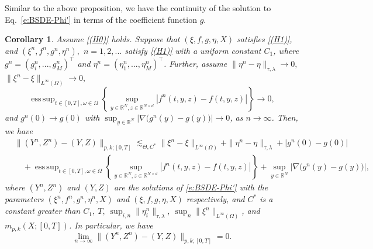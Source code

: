 \documentclass[11pt,reqno]{amsart}
\def\R{\mathbb R}
\newtheorem{corollary}{Corollary}[section]
\DeclareMathOperator*{\esssup}{ess\,sup}
\numberwithin{equation}{section}
\begin{document}
Similar to the above proposition, we have
the continuity of the solution to  Eq.~\eqref{e:BSDE-Phi'} in terms of the coefficient function $g$. 

\begin{corollary}\label{cor:continuity solution map under H1}			
Assume \ref{(H0)} holds. Suppose that $(\xi,f,g,\eta,X)$ satisfies \ref{(H1)}, and  $(\xi^n,f^n,g^n,\eta^n),$ $n=1,2,...$ satisfy \ref{(H1)} with a uniform constant $C_1$, 
where $g^{n} = (g^{n}_{i},...,g^{n}_{M})^{\top}$ and $\eta^{n} = (\eta^{n}_{1},...,\eta^{n}_{M})^{\top}$. Further, assume $\|\eta^{n} - \eta\|_{\tau,\lambda}\rightarrow 0, $ $\|\xi^{n} - \xi\|_{L^{\infty}(\Omega)}\rightarrow 0,$ 
$$\esssup_{t\in[0,T],\omega\in\Omega}\left\{\sup_{y\in\mathbb{R}^{N},z\in\mathbb{R}^{N\times d}}|f^{n}(t,y,z) - f(t,y,z)|\right\}\rightarrow 0,$$ and $g^n(0)\rightarrow g(0)$ with $\sup_{y\in\R^N}\left|\nabla\big(g^{n}(y)-g(y)\big)\right|\rightarrow 0$, as $n\to \infty$. Then, we have
\begin{equation}\label{e:Y^n Z^n - Y Z}
\begin{aligned}
&\|(Y^{n},Z^{n}) - (Y,Z)\|_{p,k;[0,T]} \lesssim_{\Theta,C^{*}}\|\xi^n - \xi\|_{L^{\infty}(\Omega)} + \|\eta^n - \eta\|_{\tau,\lambda} + |g^n(0) - g(0)| \\
&\quad + \esssup_{t\in[0,T],\omega\in\Omega}\left\{\sup_{y\in\mathbb{R}^{N},z\in\mathbb{R}^{N\times d}}|f^{n}(t,y,z) - f(t,y,z)|\right\} + \sup_{y\in\R^N}\left|\nabla\big(g^{n}(y)-g(y)\big)\right|,
\end{aligned}
\end{equation}
where $(Y^{n},Z^{n})$ and $(Y,Z)$ are the solutions of
\eqref{e:BSDE-Phi'} with the parameters $(\xi^n, f^n, g^n, \eta^n, X)$ and $(\xi, f, g, \eta, X)$ respectively, and $C^*$ is a constant greater than  $C_1,\ T,\ \sup_{i,n}\|\eta^{n}_{i}\|_{\tau,\lambda},\  \sup_{n}\|\xi^{n}\|_{L^{\infty}(\Omega)}$, and $m_{p,k}(X;[0,T])$. In particular, we have
$$\lim_{n\to\infty}\|(Y^{n},Z^{n}) - (Y,Z)\|_{p,k;[0,T]}=0.$$
\end{corollary}
\end{document}
